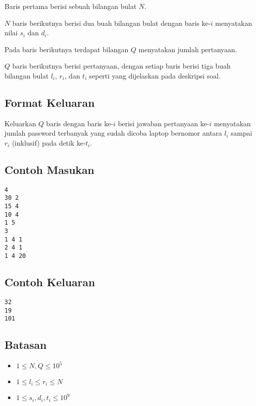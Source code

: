 \documentclass{article}
\begin{document}
\par\noindent Baris pertama berisi sebuah bilangan bulat $N$.
\par\noindent $N$ baris berikutnya berisi dua buah bilangan bulat dengan baris ke-$i$ menyatakan nilai $s_i$ dan $d_i$.
\par\noindent Pada baris berikutnya terdapat bilangan $Q$ menyatakan jumlah pertanyaan.
\par\noindent $Q$ baris berikutnya berisi pertanyaan, dengan setiap baris berisi tiga buah bilangan bulat $l_i$, $r_i$, dan $t_i$ seperti yang dijelaskan pada deskripsi soal.

\subsection*{Format Keluaran}

\par\noindent Keluarkan $Q$ baris dengan baris ke-$i$ berisi jawaban pertanyaan ke-$i$ menyatakan jumlah password terbanyak yang sudah dicoba laptop bernomor antara $l_i$ sampai $r_i$ (inklusif) pada detik ke-$t_i$.

\subsection*{Contoh Masukan}

\begin{lstlisting}
4
30 2
15 4
10 4
1 5
3
1 4 1
2 4 1
1 4 20
\end{lstlisting}

\subsection*{Contoh Keluaran}

\begin{lstlisting}
32
19
101
\end{lstlisting}

\subsection*{Batasan}

\begin{itemize}
  \item $1 \leq N, Q \leq 10^5$
  \item $1 \leq l_i \leq r_i \leq N$
  \item $1 \leq s_i, d_i, t_i \leq 10^9$
\end{itemize}
\end{document}
